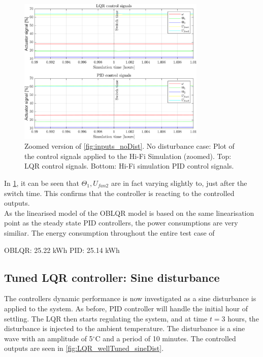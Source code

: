 \begin{figure}[H]
	\centering
	\includegraphics[width=0.8\textwidth]{Graphics/fig_inputs_noDist_zoom.png}
	\caption{Zoomed version of \cref{fig:inputs_noDist}. No disturbance case: Plot of the control signals applied to the Hi-Fi Simulation (zoomed). Top: LQR control signals. Bottom: Hi-Fi simulation PID control signals.}
	\label{fig:inputs_noDist_zoom}
\end{figure}
 
In \cref{fig:inputs_noDist_zoom}, it can be seen that $ \Theta_1, U_{fan2} $ are in fact varying slightly to, just after the switch time. This confirms that the controller is reacting to the controlled outputs. \\
\noindent As the linearised model of the OBLQR model is based on the same linearisation point as the steady state PID controllers, the power consumptions are very similiar. The energy consumption throughout the entire test case of 

OBLQR: 25.22 kWh
PID: 25.14 kWh


\newpage
\subsection{Tuned LQR controller: Sine disturbance}
The controllers dynamic performance is now investigated as a sine disturbance is applied to the system. As before, PID controller will handle the initial hour of settling. The LQR then starts regulating the system, and at time $t=3$ hours, the disturbance is injected to the ambient temperature. The disturbance is a sine wave with an amplitude of 5$^{\circ}$C and a period of 10 minutes. The controlled outputs are seen in \cref{fig:LQR_wellTuned_sineDist}.


